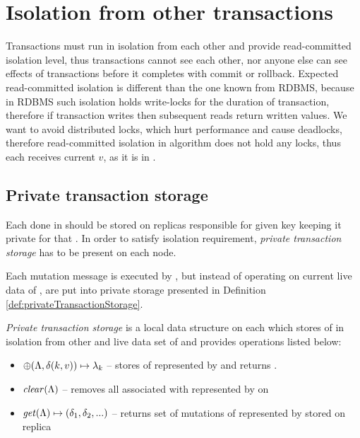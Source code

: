 
\section{Isolation from other transactions}
Transactions must run in isolation from each other and provide read-committed isolation level, thus transactions cannot see each other, nor anyone else can see effects of transactions before it completes with commit or rollback. Expected read-committed isolation is different than the one known from RDBMS, because in RDBMS such isolation holds write-locks for the duration of transaction, therefore if transaction writes then subsequent reads return written values. We want to avoid distributed locks, which hurt performance and cause deadlocks, therefore read-committed isolation in \mpt algorithm does not hold any locks, thus each \selectMessage receives current $v$, as it is in \database.

\subsection{Private transaction storage}
\label{sec:mpp:privateTxStorage}
Each  done in \transaction should be stored on replicas responsible for given key keeping it private for that \transaction. In order to satisfy isolation requirement, \emph{private transaction storage} has to be present on each node.

Each mutation message is executed by , but instead of operating on current live data of \database, \mutations are put into private storage presented in Definition \ref{def:privateTransactionStorage}. 

\begin{definition}
\label{def:privateTransactionStorage}
\emph{Private transaction storage} is a local data structure on each  which stores \mutations of \transaction in isolation from other \transactions and live data set of \database and provides operations listed below: 
  \begin{itemize}
    \item $\oplus(\text{$\Lambda$}, \text{$\delta(k, v)$}) \mapsto \text{$\lambda_{k}$}$ -- stores  of \transactionj represented by \txState and returns . 
    \item $\mathit{clear}(\text{$\Lambda$})$ -- removes all \mutations associated with \transactionj represented by \txState on 
    \item $\mathit{get}(\text{$\Lambda$}) \mapsto \text{$(\delta_{1}, \delta_{2}, ...)$}$ -- returns set of mutations of  \transactionj represented by \txState stored on replica  
  \end{itemize}
\end{definition}

